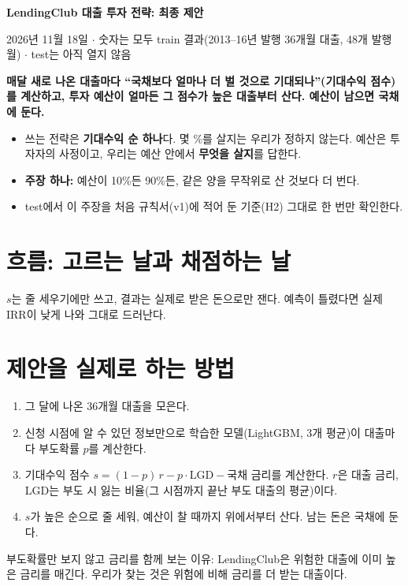 \documentclass[11pt]{report}
\begin{document}
\begin{center}
{\LARGE\bfseries LendingClub 대출 투자 전략: 최종 제안\par}\medskip
{\small 2026년 11월 18일 \ensuremath{\cdot} 숫자는 모두 train 결과(2013--16년 발행 36개월 대출, 48개 발행월) \ensuremath{\cdot} test는 아직 열지 않음\par}
\end{center}

\begin{keybox}[제안]
\textbf{매달 새로 나온 대출마다 ``국채보다 얼마나 더 벌 것으로 기대되나''(기대수익 점수)를 계산하고, 투자 예산이 얼마든 그 점수가 높은 대출부터 산다. 예산이 남으면 국채에 둔다.}
\medskip

\begin{itemize}[leftmargin=*]
\item 쓰는 전략은 \textbf{기대수익 순 하나}다. 몇 \%를 살지는 우리가 정하지 않는다. 예산은 투자자의 사정이고, 우리는 예산 안에서 \textbf{무엇을 살지}를 답한다.
\item \textbf{주장 하나:} 예산이 10\%든 90\%든, 같은 양을 무작위로 산 것보다 더 번다.
\item test에서 이 주장을 처음 규칙서(v1)에 적어 둔 기준(H2) 그대로 한 번만 확인한다.
\end{itemize}
\end{keybox}

\section{흐름: 고르는 날과 채점하는 날}

$s$는 줄 세우기에만 쓰고, 결과는 실제로 받은 돈으로만 잰다. 예측이 틀렸다면 실제 IRR이 낮게 나와 그대로 드러난다.

\section{제안을 실제로 하는 방법}
\begin{enumerate}[leftmargin=*]
\item 그 달에 나온 36개월 대출을 모은다.
\item 신청 시점에 알 수 있던 정보만으로 학습한 모델(LightGBM, 3개 평균)이 대출마다 부도확률 $p$를 계산한다.
\item 기대수익 점수 $s=(1-p)\,r-p\cdot\mathrm{LGD}-\text{국채 금리}$를 계산한다. $r$은 대출 금리, LGD는 부도 시 잃는 비율(그 시점까지 끝난 부도 대출의 평균)이다.
\item $s$가 높은 순으로 줄 세워, 예산이 찰 때까지 위에서부터 산다. 남는 돈은 국채에 둔다.
\end{enumerate}
부도확률만 보지 않고 금리를 함께 보는 이유: LendingClub은 위험한 대출에 이미 높은 금리를 매긴다. 우리가 찾는 것은 위험에 비해 금리를 더 받는 대출이다.
\end{document}
